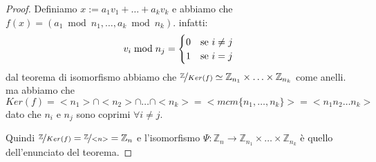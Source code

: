 \documentclass[../main.tex]{subfiles}
\begin{document}
\begin{proof}
    Definiamo $x := a_1 v_1 + \ldots + a_k v_k$ e abbiamo che $f(x) = (a_1 \bmod n_1, \ldots , a_k \bmod n_k)$. infatti:
    \begin{equation*}
        v_i \bmod n_j =
        \begin{cases}
            0 & \text{se } i \neq j \\
            1 & \text{se } i = j
        \end{cases}\\
    \end{equation*}
    dal teorema di isomorfismo abbiamo che $\nicefrac{\mathbb{Z}}{Ker(f)} \simeq \mathbb{Z}_{n_1} \times \ldots \times \mathbb{Z}_{n_k} $ come anelli. ma abbiamo che $Ker(f) = <n_1> \cap <n_2> \cap \ldots \cap <n_k> = <mcm\{n_1 ,\ldots, n_k\}> = <n_1 n_2 \ldots n_k>$ dato che $n_i$ e $n_j$ sono coprimi $\forall i \neq j$.

    Quindi $\nicefrac{\mathbb{Z}}{Ker(f)} = \nicefrac{\mathbb{Z}}{<n>} = \mathbb{Z}_n $ e l'isomorfismo $\Psi: \mathbb{Z}_n \rightarrow \mathbb{Z}_{n_1} \times \ldots \times \mathbb{Z}_{n_k}$ è quello dell'enunciato del teorema.
\end{proof}
\end{document}
